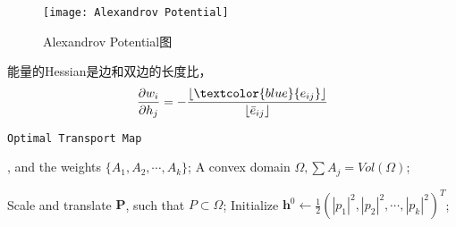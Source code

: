 \begin{figure}[h]
    \centering
    \texttt{[image: Alexandrov Potential]}
    \caption{Alexandrov Potential图}
    \label{fig:Alexandrov Potential}
\end{figure}

能量的Hessian是边和双边的长度比，
\begin{equation*}
    \frac{\partial w_i}{\partial h_j} = -\frac{\left \lfloor \textcolor{blue}{ e_{ij}} \right \rfloor }{\left \lfloor \bar{e}_{ij}  \right \rfloor } 
    \label{equ:Alexandrov}
\end{equation*}

\begin{algorithm}[H]
    \renewcommand{\thealgocf}{}
    \caption{\texttt{Optimal Transport Map}}
    , and the weights $\{A_1, A_2, \cdots , A_k \}$; A convex domain $\Omega, \sum A_j = Vol(\Omega)$;
    
    Scale and translate $\mathbf{P}$, such that $P \subset \Omega$;
    Initialize $\mathbf{h}^0 \gets \frac{1}{2} \left ( \left | p_1 \right |^2, \left | p_2 \right |^2, \cdots, \left | p_k \right |^2   \right )^T  $;

\end{algorithm}

